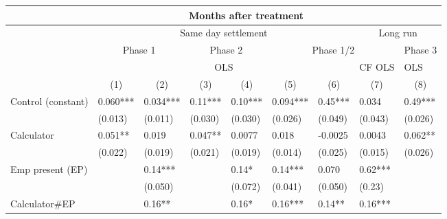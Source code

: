 \begin{tabular}{llrrrlrrr}
\toprule
\multicolumn{1}{|r}{} & \multicolumn{7}{c}{Months after treatment}            &  \\
\midrule
\multicolumn{1}{r|}{} & \multicolumn{6}{c|}{Same day settlement}      & \multicolumn{2}{c}{Long run} \\
\midrule
\midrule
\multicolumn{1}{r|}{} & \multicolumn{2}{c|}{Phase 1} & \multicolumn{2}{c|}{Phase 2} & \multicolumn{3}{c|}{Phase 1/2} & \multicolumn{1}{c}{Phase 3} \\
\midrule
\multicolumn{1}{r|}{} & \multicolumn{6}{c|}{OLS}                      & \multicolumn{1}{c|}{CF OLS} & \multicolumn{1}{l}{OLS} \\
\midrule
\midrule
      & \multicolumn{1}{c}{(1)} & \multicolumn{1}{c}{(2)} & \multicolumn{1}{c}{(3)} & \multicolumn{1}{c}{(4)} & \multicolumn{1}{c}{(5)} & \multicolumn{1}{c}{(6)} & \multicolumn{1}{c}{(7)} & \multicolumn{1}{c}{(8)} \\
Control (constant) & 0.060*** & \multicolumn{1}{l}{0.034***} & \multicolumn{1}{l}{0.11***} & \multicolumn{1}{l}{0.10***} & 0.094*** & \multicolumn{1}{l}{0.45***} & \multicolumn{1}{l}{0.034} & \multicolumn{1}{l}{0.49***} \\
      & (0.013) & \multicolumn{1}{l}{(0.011)} & \multicolumn{1}{l}{(0.030)} & \multicolumn{1}{l}{(0.030)} & (0.026) & \multicolumn{1}{l}{(0.049)} & \multicolumn{1}{l}{(0.043)} & \multicolumn{1}{l}{(0.026)} \\
Calculator & 0.051** & \multicolumn{1}{l}{0.019} & \multicolumn{1}{l}{0.047**} & \multicolumn{1}{l}{0.0077} & 0.018 & \multicolumn{1}{l}{-0.0025} & \multicolumn{1}{l}{0.0043} & \multicolumn{1}{l}{0.062**} \\
      & (0.022) & \multicolumn{1}{l}{(0.019)} & \multicolumn{1}{l}{(0.021)} & \multicolumn{1}{l}{(0.019)} & (0.014) & \multicolumn{1}{l}{(0.025)} & \multicolumn{1}{l}{(0.015)} & \multicolumn{1}{l}{(0.026)} \\
Emp present (EP) &       & \multicolumn{1}{l}{0.14***} & \multicolumn{1}{l}{} & \multicolumn{1}{l}{0.14*} & 0.14*** & \multicolumn{1}{l}{0.070} & \multicolumn{1}{l}{0.62***} &  \\
      &       & \multicolumn{1}{l}{(0.050)} & \multicolumn{1}{l}{} & \multicolumn{1}{l}{(0.072)} & (0.041) & \multicolumn{1}{l}{(0.050)} & \multicolumn{1}{l}{(0.23)} &  \\
Calculator\#EP &       & \multicolumn{1}{l}{0.16**} & \multicolumn{1}{l}{} & \multicolumn{1}{l}{0.16*} & 0.16*** & \multicolumn{1}{l}{0.14**} & \multicolumn{1}{l}{0.16***} &  \\

\end{tabular}
